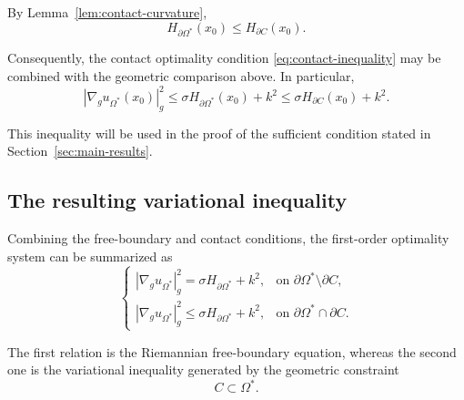 \documentclass{article}
\renewcommand{\boxed}[1]{#1}
\begin{document}
By Lemma~\ref{lem:contact-curvature},
\begin{equation}
H_{\partial\Omega^\ast}(x_0)
\leq
H_{\partial C}(x_0).
\label{eq:H-contact-comparison}
\end{equation}

Consequently, the contact optimality condition
\eqref{eq:contact-inequality} may be combined with the geometric
comparison above. In particular,
\begin{equation}
|\nabla_g u_{\Omega^\ast}(x_0)|_g^2
\leq
\sigma H_{\partial\Omega^\ast}(x_0)+k^2
\leq
\sigma H_{\partial C}(x_0)+k^2.
\label{eq:contact-chain}
\end{equation}

This inequality will be used in the proof of the sufficient condition
stated in Section~\ref{sec:main-results}.


\subsection{The resulting variational inequality}
\label{subsec:variational-inequality-final}

Combining the free-boundary and contact conditions, the first-order
optimality system can be summarized as
\begin{equation}
\boxed{
\begin{cases}
|\nabla_g u_{\Omega^\ast}|_g^2
=
\sigma H_{\partial\Omega^\ast}+k^2,
&
\text{on }\partial\Omega^\ast\setminus\partial C,
\\[2mm]
|\nabla_g u_{\Omega^\ast}|_g^2
\leq
\sigma H_{\partial\Omega^\ast}+k^2,
&
\text{on }\partial\Omega^\ast\cap\partial C.
\end{cases}
}
\label{eq:optimality-system}
\end{equation}

The first relation is the Riemannian free-boundary equation, whereas
the second one is the variational inequality generated by the
geometric constraint
\[
C\subset\Omega^\ast.
\]
\end{document}
